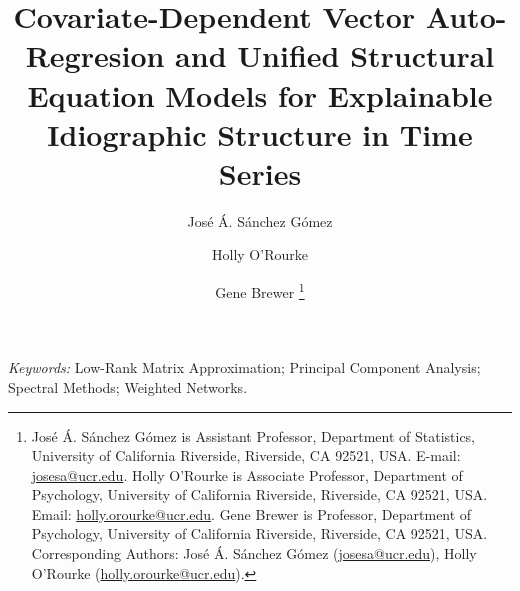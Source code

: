 \documentclass[12pt]{article}
\begin{document}
\def\spacingset#1{\renewcommand{\baselinestretch}
{#1}\small\normalsize} \spacingset{1}



{
	\title{\bf Covariate-Dependent Vector Auto-Regresion and Unified Structural Equation Models for Explainable Idiographic Structure in Time Series}
	\author{
		José Á. Sánchez Gómez \and  Holly O'Rourke \and  Gene Brewer \thanks{ José Á. Sánchez Gómez is Assistant Professor, Department of Statistics, University of California Riverside, Riverside, CA 92521, USA. E-mail: \href{mailto:josesa@ucr.edu}{josesa@ucr.edu}. Holly O'Rourke is Associate Professor, Department of Psychology, University of California Riverside, Riverside, CA 92521, USA. Email: \href{mailto:holly.orourke@ucr.edu}{holly.orourke@ucr.edu}. Gene Brewer is Professor, Department of Psychology, University of California Riverside, Riverside, CA 92521, USA.\\
		Corresponding Authors: José Á. Sánchez Gómez (\href{mailto:josesa@ucr.edu}{josesa@ucr.edu}), Holly O'Rourke (\href{mailto:holly.orourke@ucr.edu}{holly.orourke@ucr.edu}).}
	}
	\date{}
	\maketitle
}


\bigskip
\begin{abstract}
	
\end{abstract}

\noindent
{\it Keywords:}  Low-Rank Matrix Approximation; Principal Component Analysis; Spectral Methods;  Weighted Networks.
\vfill


\newpage
\spacingset{1.5}
\setlength{\abovedisplayskip}{2pt}
\setlength{\belowdisplayskip}{2pt}












\end{document}
